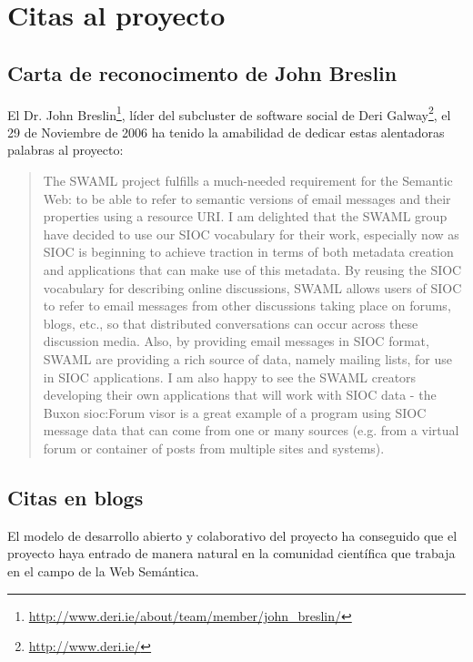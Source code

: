 
\chapter{Citas al proyecto}

\section{Carta de reconocimento de John Breslin}

El Dr. John Breslin\footnote{\url{http://www.deri.ie/about/team/member/john_breslin/}},
líder del subcluster de software social de Deri Galway\footnote{\url{http://www.deri.ie/}},
el 29 de Noviembre de 2006 ha tenido la amabilidad de dedicar estas alentadoras palabras 
al proyecto:

\begin{quote}
 The SWAML project fulfills a much-needed requirement for the Semantic 
 Web: to be able to refer to semantic versions of email messages and 
 their properties using a resource URI.  I am delighted that the SWAML 
 group have decided to use our SIOC vocabulary for their work, especially 
 now as SIOC is beginning to achieve traction in terms of both metadata 
 creation and applications that can make use of this metadata.  By 
 reusing the SIOC vocabulary for describing online discussions, SWAML 
 allows users of SIOC to refer to email messages from other discussions 
 taking place on forums, blogs, etc., so that distributed conversations 
 can occur across these discussion media.  Also, by providing email 
 messages in SIOC format, SWAML are providing a rich source of data, 
 namely mailing lists, for use in SIOC applications.  I am also happy to 
 see the SWAML creators developing their own applications that will work 
 with SIOC data - the Buxon sioc:Forum visor is a great example of a 
 program using SIOC message data that can come from one or many sources 
 (e.g. from a virtual forum or container of posts from multiple sites 
 and systems).
\end{quote}

\newpage

\section{Citas en blogs}

El modelo de desarrollo abierto y colaborativo del proyecto ha conseguido que el proyecto
haya entrado de manera natural en la comunidad científica que trabaja en el campo de la
Web Semántica.

